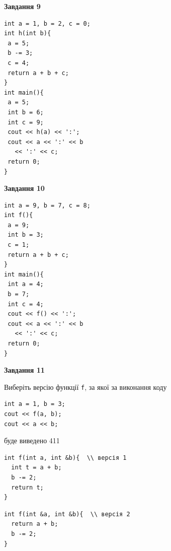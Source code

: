 \documentclass[12pt, ukrainian]{article}
\def\code#1{\Verb!#1!}
\begin{document}
{\begin {large}
\begin{minipage}[t]{11.0cm}
\end{minipage}


\begin{minipage}[t]{7.0cm}

\begin{center}
\textbf{Завдання 9}
\end{center}
\vspace{-8mm}

\begin{verbatim}
int a = 1, b = 2, c = 0;
int h(int b){
 a = 5;
 b -= 3;
 c = 4;
 return a + b + c;
}
int main(){
 a = 5;
 int b = 6;
 int c = 9;
 cout << h(a) << ':';
 cout << a << ':' << b 
   << ':' << c;
 return 0;
}
\end{verbatim}



\begin{center}
\textbf{Завдання 10}
\end{center}
\vspace{-8mm}

\begin{verbatim}
int a = 9, b = 7, c = 8;
int f(){
 a = 9;
 int b = 3;
 c = 1;
 return a + b + c;
}
int main(){
 int a = 4;
 b = 7;
 int c = 4;
 cout << f() << ':';
 cout << a << ':' << b 
   << ':' << c;
 return 0;
}
\end{verbatim}

\end{minipage}
\vline \hspace{1mm}
\begin{minipage}[t]{11.0cm}

\begin{center}
\textbf{Завдання 11}
\end{center}
Виберіть версію функції \code{f}, за якої за виконання коду
\begin{verbatim}
int a = 1, b = 3;
cout << f(a, b);
cout << a << b;
\end{verbatim}

буде виведено 411

\begin{verbatim}
int f(int a, int &b){  \\ версія 1
  int t = a + b;
  b -= 2;
  return t;
}
\end{verbatim}

\vspace{-8mm}\begin{verbatim}
int f(int &a, int &b){  \\ версія 2
  return a + b;
  b -= 2;
}
\end{verbatim}


\end{minipage}
\end{large}}
\end{document}
